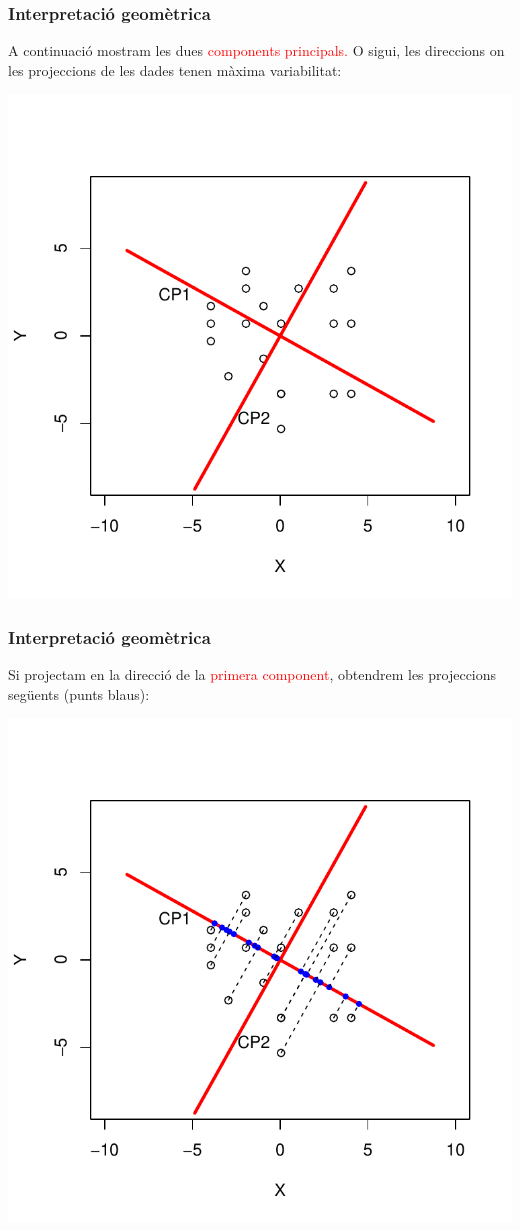 \documentclass[12pt,t]{beamer}
\newcommand{\red}[1]{\textcolor{red}{#1}}
\theoremstyle{plain}
\theoremstyle{definition}
\begin{document}
\begin{frame}
\frametitle{Interpretació geomètrica}
{\small A continuació mostram les dues \red{components principals.} O sigui, les direccions on les projeccions de les dades tenen màxima variabilitat:}
\vspace*{-1cm}

\includegraphics{ACP-002}
\end{frame}

\begin{frame}
\frametitle{Interpretació geomètrica}
{\small Si projectam en la direcció de la \red{primera component}, obtendrem les projeccions següents (punts blaus):}
\vspace*{-1cm}

\includegraphics{ACP-003}
\end{frame}
\end{document}

